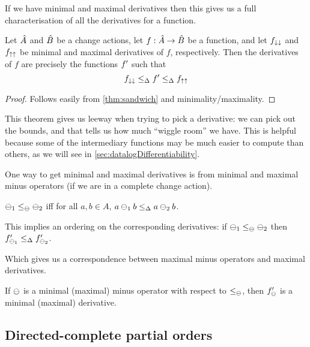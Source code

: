 If we have minimal and maximal derivatives then this gives us a full
characterisation of all the derivatives for a function.

\begin{thm}
\label{thm:derivativeCharacterization}
  Let $\hat{A}$ and $\hat{B}$ be a change actions, let
  $f: \hat{A} \rightarrow \hat{B}$ be a function, and let $f_{\downarrow\downarrow}$ and
  $f_{\uparrow\uparrow}$ be minimal and maximal derivatives of $f$, respectively.
  Then the derivatives of $f$ are precisely
  the functions $f'$ such that
  \begin{displaymath}
    f_{\downarrow\downarrow} \leq_\Delta f' \leq_\Delta f_{\uparrow\uparrow}
  \end{displaymath}
\end{thm}
\ifproofs
\begin{proof}
  Follows easily from \cref{thm:sandwich} and minimality/maximality.
\end{proof}
\fi

This theorem gives us leeway when trying to pick a derivative: we can pick out the
bounds, and that tells us how much ``wiggle room'' we have. This is helpful
because some of the intermediary functions may be much easier to compute than
others, as we will see in \cref{sec:datalogDifferentiability}.

One way to get minimal and maximal derivatives is from minimal and maximal minus
operators (if we are in a complete change action).

\begin{defn}
  $\ominus_1 \leq_\ominus \ominus_2$ iff for all $a,b \in A$, $a \ominus_1 b
  \leq_\Delta a \ominus_2 b$.
\end{defn}

This implies an ordering on the corresponding derivatives: if $\ominus_1 \leq_\ominus \ominus_2$ then
$f'_{\ominus_1} \leq_\Delta f'_{\ominus_2}$.

Which gives us a correspondence between maximal minus operators and maximal derivatives.

\begin{prop}
  \label{prop:maximalMinusDerivatives}
  If $\ominus$ is a minimal (maximal) minus operator with respect to
  $\leq_\ominus$, then $f'_\ominus$ is a minimal (maximal) derivative.
\end{prop}

\subsection{Directed-complete partial orders}

